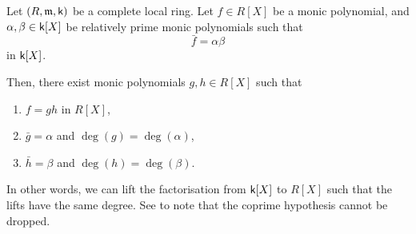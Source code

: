 \begin{thm} \label{thm:hensel}
	Let $(R, \mathfrak{m}, \mathsf{k})$ be a complete local ring. Let $f \in R[X]$ be a monic polynomial, and $\alpha, \beta \in \mathsf{k}[X]$ be relatively prime monic polynomials such that
	\begin{equation*} 
		\bar{f} = \alpha \beta 
	\end{equation*}
	in $\mathsf{k}[X]$. 

	Then, there exist monic polynomials $g, h \in R[X]$ such that
	\begin{enumerate}
		\item $f = gh$ in $R[X]$,
		\item $\bar{g} = \alpha$ and $\deg(g) = \deg(\alpha)$,
		\item $\bar{h} = \beta$ and $\deg(h) = \deg(\beta)$.
	\end{enumerate}
\end{thm}
In other words, we can lift the factorisation from $\mathsf{k}[X]$ to $R[X]$ such that the lifts have the same degree. See  to note that the coprime hypothesis cannot be dropped.
